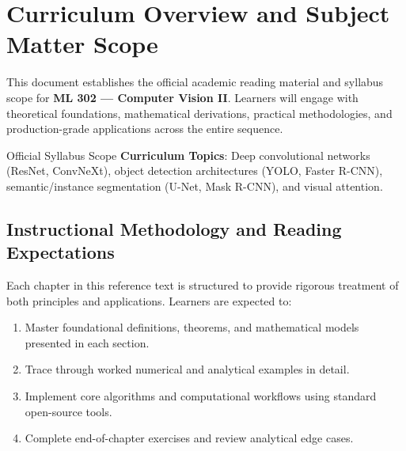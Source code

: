 \section{Curriculum Overview and Subject Matter Scope}

This document establishes the official academic reading material and syllabus scope for \textbf{ML 302 --- Computer Vision II}. Learners will engage with theoretical foundations, mathematical derivations, practical methodologies, and production-grade applications across the entire sequence.

\begin{InsightBox}{Official Syllabus Scope}
  \textbf{Curriculum Topics}: Deep convolutional networks (ResNet, ConvNeXt), object detection architectures (YOLO, Faster R-CNN), semantic/instance segmentation (U-Net, Mask R-CNN), and visual attention.
\end{InsightBox}

\subsection{Instructional Methodology and Reading Expectations}

Each chapter in this reference text is structured to provide rigorous treatment of both principles and applications. Learners are expected to:
\begin{enumerate}
  \item Master foundational definitions, theorems, and mathematical models presented in each section.
  \item Trace through worked numerical and analytical examples in detail.
  \item Implement core algorithms and computational workflows using standard open-source tools.
  \item Complete end-of-chapter exercises and review analytical edge cases.
\end{enumerate}

